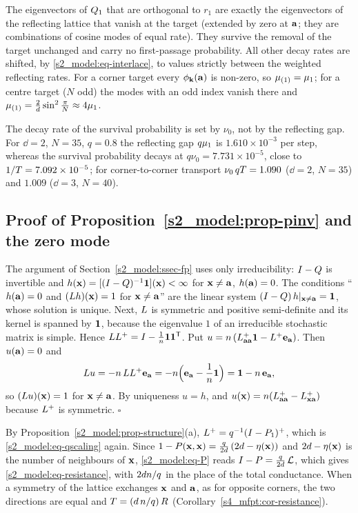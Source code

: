The eigenvectors of $Q_1$ that are orthogonal to $r_1$ are exactly the eigenvectors of the reflecting lattice that
vanish at the target (extended by zero at $\mathbf{a}$; they are combinations of cosine modes of equal rate). They survive
the removal of the target unchanged and carry no first-passage probability. All other decay rates are shifted, by
\eqref{s2_model:eq-interlace}, to values strictly between the weighted reflecting rates. For a corner target every
$\phi_{\mathbf{k}}(\mathbf{a})$ is non-zero, so $\mu_{(1)}=\mu_{1}$; for a centre target ($N$ odd) the modes with an odd index vanish
there and $\mu_{(1)}=\frac{2}{d}\sin^{2}\frac{\pi}{N}\approx4\mu_{1}$.

The decay rate of the survival probability is set by $\nu_0$, not by the reflecting gap. For $\dd=2$, $N=35$, $q=0.8$
the reflecting gap $q\mu_{1}$ is $1.610\times10^{-3}$ per step, whereas the survival probability decays at
$q\nu_0=7.731\times10^{-5}$, close to $1/T=7.092\times10^{-5}$; for corner-to-corner transport
$\nu_0\,qT=1.090$ ($\dd=2$, $N=35$) and $1.009$ ($\dd=3$, $N=40$).

\subsection{Proof of Proposition~\ref{s2_model:prop-pinv} and the zero mode}

The argument of Section~\ref{s2_model:ssec-fp} uses only irreducibility: $I-Q$ is invertible and
$h(\mathbf{x})=[(I-Q)^{-1}\mathbf{1}](\mathbf{x})<\infty$ for $\mathbf{x}\neq\mathbf{a}$, $h(\mathbf{a})=0$. The conditions ``$h(\mathbf{a})=0$ and $(L h)(\mathbf{x})=1$
for $\mathbf{x}\neq\mathbf{a}$'' are the linear system $(I-Q)\,h|_{\mathbf{x}\neq\mathbf{a}}=\mathbf{1}$, whose solution is unique. Next, $L$ is
symmetric and positive semi-definite and its kernel is spanned by $\mathbf{1}$, because the eigenvalue $1$ of an
irreducible stochastic matrix is simple. Hence $LL^{+}=I-\frac{1}{n}\mathbf{1}\mathbf{1}^{\mathsf{T}}$. Put
$u=n\,(L^{+}_{\mathbf{a}\mathbf{a}}\mathbf{1}-L^{+}\mathbf{e}_{\mathbf{a}})$. Then $u(\mathbf{a})=0$ and
\[
  L u=-n\,LL^{+}\mathbf{e}_{\mathbf{a}}=-n\Bigl(\mathbf{e}_{\mathbf{a}}-\frac{1}{n}\mathbf{1}\Bigr)=\mathbf{1}-n\,\mathbf{e}_{\mathbf{a}},
\]
so $(L u)(\mathbf{x})=1$ for $\mathbf{x}\neq\mathbf{a}$. By uniqueness $u=h$, and $u(\mathbf{x})=n(L^{+}_{\mathbf{a}\mathbf{a}}-L^{+}_{\mathbf{x}\mathbf{a}})$ because $L^{+}$ is
symmetric. \hfill$\square$

By Proposition~\ref{s2_model:prop-structure}(a), $L^{+}=q^{-1}(I-P_1)^{+}$, which is \eqref{s2_model:eq-qscaling}
again. Since $1-P(\mathbf{x},\mathbf{x})=\frac{q}{2d}\,(2d-\eta(\mathbf{x}))$ and $2d-\eta(\mathbf{x})$ is the number of neighbours of
$\mathbf{x}$, \eqref{s2_model:eq-P} reads $I-P=\frac{q}{2d}\,\mathcal L$, which gives \eqref{s2_model:eq-resistance}, with
$2dn/q$ in the place of the total conductance. When a symmetry of the lattice exchanges $\mathbf{x}$ and $\mathbf{a}$, as for
opposite corners, the two directions are equal and $T=(d\,n/q)\,R$
(Corollary~\ref{s4_mfpt:cor-resistance}).

